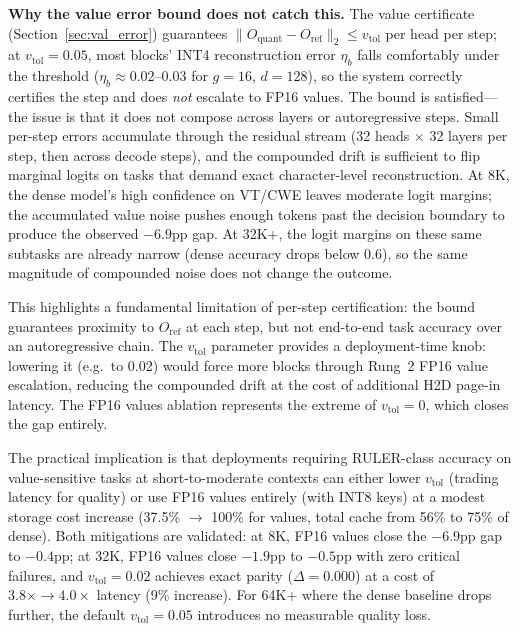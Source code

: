 \documentclass[11pt,a4paper]{article}
\theoremstyle{definition}
\theoremstyle{remark}
\newcommand{\norm}[1]{\lVert #1 \rVert}
\begin{document}
\textbf{Why the value error bound does not catch this.}  The value certificate (Section~\ref{sec:val_error}) guarantees $\norm{O_{\mathrm{quant}} - O_{\mathrm{ref}}}_2 \leq v_{\mathrm{tol}}$ per head per step; at $v_{\mathrm{tol}}{=}0.05$, most blocks' INT4 reconstruction error $\eta_b$ falls comfortably under the threshold ($\eta_b \approx 0.02\text{--}0.03$ for $g{=}16$, $d{=}128$), so the system correctly certifies the step and does \emph{not} escalate to FP16 values.  The bound is satisfied---the issue is that it does not compose across layers or autoregressive steps.  Small per-step errors accumulate through the residual stream (32 heads $\times$ 32 layers per step, then across decode steps), and the compounded drift is sufficient to flip marginal logits on tasks that demand exact character-level reconstruction.  At 8K, the dense model's high confidence on VT/CWE leaves moderate logit margins; the accumulated value noise pushes enough tokens past the decision boundary to produce the observed $-6.9$pp gap.  At 32K+, the logit margins on these same subtasks are already narrow (dense accuracy drops below 0.6), so the same magnitude of compounded noise does not change the outcome.

This highlights a fundamental limitation of per-step certification: the bound guarantees proximity to $O_{\mathrm{ref}}$ at each step, but not end-to-end task accuracy over an autoregressive chain.  The $v_{\mathrm{tol}}$ parameter provides a deployment-time knob: lowering it (e.g.\ to 0.02) would force more blocks through Rung~2 FP16 value escalation, reducing the compounded drift at the cost of additional H2D page-in latency.  The FP16 values ablation represents the extreme of $v_{\mathrm{tol}}{=}0$, which closes the gap entirely.

The practical implication is that deployments requiring RULER-class accuracy on value-sensitive tasks at short-to-moderate contexts can either lower $v_{\mathrm{tol}}$ (trading latency for quality) or use FP16 values entirely (with INT8 keys) at a modest storage cost increase (37.5\% $\to$ 100\% for values, total cache from 56\% to 75\% of dense).  Both mitigations are validated: at 8K, FP16 values close the $-6.9$pp gap to $-0.4$pp; at 32K, FP16 values close $-1.9$pp to $-0.5$pp with zero critical failures, and $v_{\mathrm{tol}}{=}0.02$ achieves exact parity ($\Delta{=}0.000$) at a cost of $3.8\times \to 4.0\times$ latency (9\% increase).  For 64K+ where the dense baseline drops further, the default $v_{\mathrm{tol}}{=}0.05$ introduces no measurable quality loss.
\end{document}
